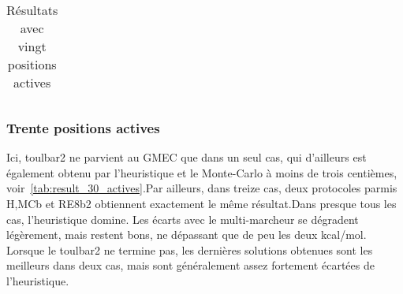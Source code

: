 \begin{table}[h]
{\begin{tabular}{cccccc}
 \end{tabular}
}   
 \caption{Résultats  avec vingt positions actives }
\label{tab:result_20_actives}   
\end{table}


   \subsubsection{Trente positions actives}
Ici, toulbar2 ne parvient au GMEC que dans un seul cas, qui d'ailleurs est également obtenu par l'heuristique et le Monte-Carlo à moins de trois centièmes, voir~\ref{tab:result_30_actives}.Par ailleurs, dans treize cas, deux protocoles parmis H,MCb et RE8b2 obtiennent exactement le même résultat.Dans presque tous les cas, l'heuristique domine. Les écarts avec le multi-marcheur se dégradent légèrement, mais restent bons, ne dépassant que de peu les deux kcal/mol. Lorsque le toulbar2 ne termine pas, les  dernières solutions obtenues sont les meilleurs dans deux cas, mais sont généralement assez fortement écartées de l'heuristique.     


